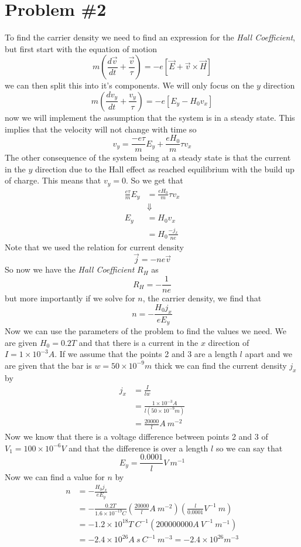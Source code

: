 \documentclass[11pt]{article}
\numberwithin{equation}{section}
\begin{document}
\section{Problem \#2}
To find the carrier density we need to find an expression for the \emph{Hall Coefficient}, but first start with the equation of motion
$$m\left(\frac{d\vec{v}}{dt} + \frac{\vec{v}}{\tau}\right) = -e[\vec{E}+\vec{v}\times\vec{H}]$$
we can then split this into it's components. We will only focus on the $y$ direction
$$m\left(\frac{dv_y}{dt}+\frac{v_y}{\tau}\right) = -e\left[E_y-H_0v_x\right]$$
now we will implement the assumption that the system is in a steady state. This implies that the velocity will not change with time so
$$v_y = \frac{-e\tau}{m}E_y +\frac{eH_0}{m}\tau v_x$$
The other consequence of the system being at a steady state is that the current in the $y$ direction due to the Hall effect as reached equilibrium with the build up of charge. This means that $v_y = 0$. So we get that
\begin{align*}
\frac{e\tau}{m}E_y &= \frac{eH_0}{m}\tau v_x\\
&\Downarrow\\
E_y &= H_0 v_x\\
 &= H_0 \frac{-j_x}{ne}
\end{align*}
Note that we used the relation for current density
$$\vec{j} = -ne\vec{v}$$
So now we have the \emph{Hall Coefficient} $R_H$ as
$$R_H = -\frac{1}{ne}$$
but more importantly if we solve for $n$, the carrier density, we find that
$$n = -\frac{H_0j_x}{eE_y}$$
Now we can use the parameters of the problem to find the values we need. We are given $H_0 = 0.2\unit{T}$ and that there is a current in the $x$ direction of $I=1\times10^{-3}\unit{A}$. If we assume that the points 2 and 3 are a length $l$ apart and we are given that the bar is $w=50\times10^{-9}\unit{m}$ thick we can find the current density $j_x$ by
\begin{align*}
j_x &= \frac{I}{lw}\\
&= \frac{1\times10^{-3}\unit{A}}{l(50\times10^{-9}\unit{m})}\\
&= \frac{20000}{l}\unit{A\ m^{-2}}
\end{align*}
Now we know that there is a voltage difference between points 2 and 3 of $V_1 = 100\times10^{-6}\unit{V}$ and that the difference is over a length $l$ so we can say that
$$E_y = \frac{0.0001}{l}\unit{V\ m^{-1}}$$
Now we can find a value for $n$ by
\begin{align*}
n &= -\frac{H_0j_x}{eE_y}\\
&= -\frac{0.2\unit{T}}{1.6\times10^{-19}\unit{C}}\left(\frac{20000}{l}\unit{A\ m^{-2}}\right)\left(\frac{l}{0.0001}\unit{V^{-1}\ m}\right)\\
&= -1.2\times10^{18}\unit{T\ C^{-1}}\left(200000000\unit{A\ V^{-1}\ m^{-1}}\right)\\
&= -2.4\times10^{26}\unit{A\ s\ C^{-1}\ m^{-3}} = -2.4\times10^{26}\unit{m^{-3}}
\end{align*}
\end{document}
